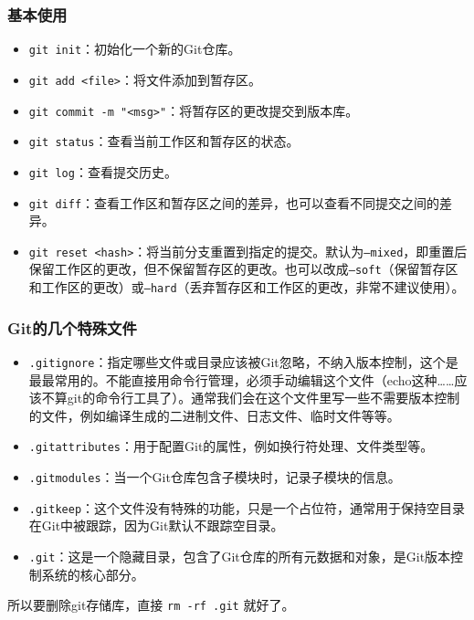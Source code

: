 \documentclass{ctexbeamer}
\begin{document}
\begin{frame}
    \frametitle{基本使用}

    \begin{itemize}
        \item \texttt{git init}：初始化一个新的Git仓库。
        \item \texttt{git add <file>}：将文件添加到暂存区。
        \item \texttt{git commit -m "<msg>"}：将暂存区的更改提交到版本库。
        \item \texttt{git status}：查看当前工作区和暂存区的状态。
        \item \texttt{git log}：查看提交历史。
        \item \texttt{git diff}：查看工作区和暂存区之间的差异，也可以查看不同提交之间的差异。
        \item \texttt{git reset <hash>}：将当前分支重置到指定的提交。默认为\texttt{--mixed}，即重置后保留工作区的更改，但不保留暂存区的更改。也可以改成\texttt{--soft}（保留暂存区和工作区的更改）或\texttt{--hard}（丢弃暂存区和工作区的更改，非常不建议使用）。
    \end{itemize}

\end{frame}

\begin{frame}
    \frametitle{Git的几个特殊文件}

    \begin{itemize}
        \item \texttt{.gitignore}：指定哪些文件或目录应该被Git忽略，不纳入版本控制，这个是最最常用的。不能直接用命令行管理，必须手动编辑这个文件（echo这种……应该不算git的命令行工具了）。通常我们会在这个文件里写一些不需要版本控制的文件，例如编译生成的二进制文件、日志文件、临时文件等等。
        \item \texttt{.gitattributes}：用于配置Git的属性，例如换行符处理、文件类型等。
        \item \texttt{.gitmodules}：当一个Git仓库包含子模块时，记录子模块的信息。
        \item \texttt{.gitkeep}：这个文件没有特殊的功能，只是一个占位符，通常用于保持空目录在Git中被跟踪，因为Git默认不跟踪空目录。
        \item \texttt{.git}：这是一个隐藏目录，包含了Git仓库的所有元数据和对象，是Git版本控制系统的核心部分。
    \end{itemize}

    所以要删除git存储库，直接 \texttt{rm -rf .git} 就好了。

\end{frame}
\end{document}
